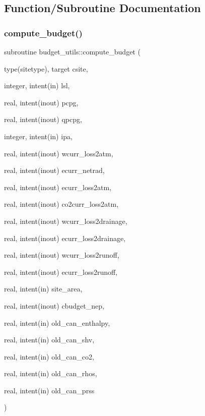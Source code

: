 \subsection{Function/\+Subroutine Documentation}
\mbox{\label{namespacebudget__utils_a07d8e19ed53707603c43556eb24b5fea}} 
\subsubsection{\texorpdfstring{compute\+\_\+budget()}{compute\_budget()}}
{\footnotesize\ttfamily subroutine budget\+\_\+utils\+::compute\+\_\+budget (\begin{DoxyParamCaption}\item[{type(sitetype), target}]{csite,  }\item[{integer, intent(in)}]{lsl,  }\item[{real, intent(inout)}]{pcpg,  }\item[{real, intent(inout)}]{qpcpg,  }\item[{integer, intent(in)}]{ipa,  }\item[{real, intent(inout)}]{wcurr\+\_\+loss2atm,  }\item[{real, intent(inout)}]{ecurr\+\_\+netrad,  }\item[{real, intent(inout)}]{ecurr\+\_\+loss2atm,  }\item[{real, intent(inout)}]{co2curr\+\_\+loss2atm,  }\item[{real, intent(inout)}]{wcurr\+\_\+loss2drainage,  }\item[{real, intent(inout)}]{ecurr\+\_\+loss2drainage,  }\item[{real, intent(inout)}]{wcurr\+\_\+loss2runoff,  }\item[{real, intent(inout)}]{ecurr\+\_\+loss2runoff,  }\item[{real, intent(in)}]{site\+\_\+area,  }\item[{real, intent(inout)}]{cbudget\+\_\+nep,  }\item[{real, intent(in)}]{old\+\_\+can\+\_\+enthalpy,  }\item[{real, intent(in)}]{old\+\_\+can\+\_\+shv,  }\item[{real, intent(in)}]{old\+\_\+can\+\_\+co2,  }\item[{real, intent(in)}]{old\+\_\+can\+\_\+rhos,  }\item[{real, intent(in)}]{old\+\_\+can\+\_\+prss }\end{DoxyParamCaption})}


